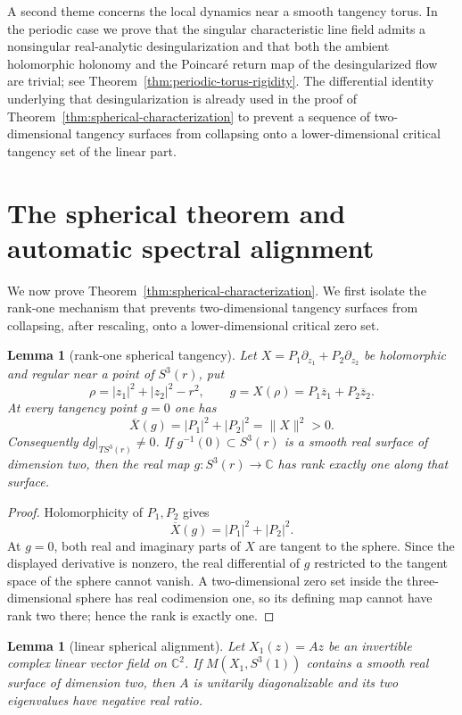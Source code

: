 \documentclass[11pt,reqno]{article}
\newtheorem{lemma}[theorem]{Lemma}
\theoremstyle{remark}
\newcommand{\C}{\mathbb C}
\newcommand{\ol}{\overline}
\begin{document}
A second theme concerns the local dynamics near a smooth tangency torus. In the periodic case we prove that the singular characteristic line field admits a nonsingular real-analytic desingularization and that both the ambient holomorphic holonomy and the Poincar\'e return map of the desingularized flow are trivial; see Theorem~\ref{thm:periodic-torus-rigidity}. The differential identity underlying that desingularization is already used in the proof of Theorem~\ref{thm:spherical-characterization} to prevent a sequence of two-dimensional tangency surfaces from collapsing onto a lower-dimensional critical tangency set of the linear part.




\section{The spherical theorem and automatic spectral alignment}\label{sec:spherical}

We now prove Theorem~\ref{thm:spherical-characterization}. We first isolate the rank-one mechanism that prevents two-dimensional tangency surfaces from collapsing, after rescaling, onto a lower-dimensional critical zero set.

\begin{lemma}[rank-one spherical tangency]\label{lem:spherical-rank}
Let $X=P_1\partial_{z_1}+P_2\partial_{z_2}$ be holomorphic and regular near a point of $S^3(r)$, put
\[
 \rho=|z_1|^2+|z_2|^2-r^2,
 \qquad g=X(\rho)=P_1\ol z_1+P_2\ol z_2.
\]
At every tangency point $g=0$ one has
\[
 \ol X(g)=|P_1|^2+|P_2|^2=\|X\|^2>0.
\]
Consequently $dg|_{TS^3(r)}\ne0$. If $g^{-1}(0)\subset S^3(r)$ is a smooth real surface of dimension two, then the real map $g:S^3(r)\to\C$ has rank exactly one along that surface.
\end{lemma}

\begin{proof}
Holomorphicity of $P_1,P_2$ gives
\[
 \ol X(g)=|P_1|^2+|P_2|^2.
\]
At $g=0$, both real and imaginary parts of $X$ are tangent to the sphere. Since the displayed derivative is nonzero, the real differential of $g$ restricted to the tangent space of the sphere cannot vanish. A two-dimensional zero set inside the three-dimensional sphere has real codimension one, so its defining map cannot have rank two there; hence the rank is exactly one.
\end{proof}

\begin{lemma}[linear spherical alignment]\label{lem:linear-spherical-alignment}
Let $X_1(z)=Az$ be an invertible complex linear vector field on $\C^2$. If $M(X_1,S^3(1))$ contains a smooth real surface of dimension two, then $A$ is unitarily diagonalizable and its two eigenvalues have negative real ratio.
\end{lemma}
\end{document}
